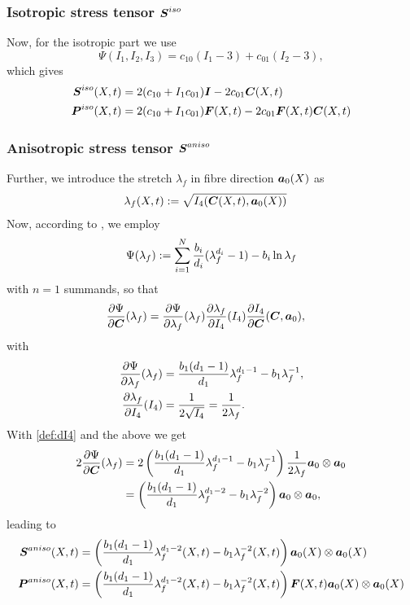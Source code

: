 \subsubsection{Isotropic stress tensor $\boldsymbol{S}^{iso}$}
Now, for the isotropic part we use
\[
	\Psi(I_1,I_2,I_3) = c_{10}(I_1-3) + c_{01}(I_2-3),
\]
which gives
\begin{align}
	\boldsymbol{S}^{iso}(X,t) &= 2(c_{10} + I_1c_{01})\boldsymbol{I} - 2c_{01}\boldsymbol{C}(X,t)\\
	\boldsymbol{P}^{iso}(X,t) &= 2(c_{10} + I_1c_{01})\boldsymbol{F}(X,t) - 2c_{01}\boldsymbol{F}(X,t)\boldsymbol{C}(X,t)
\end{align}

\subsubsection{Anisotropic stress tensor $\boldsymbol{S}^{aniso}$}
Further, we introduce the stretch $\lambda_f$ in fibre direction $\boldsymbol{a}_0(X)$ as
\begin{align*}
	\lambda_f(X,t) &:= \sqrt{I_4(\boldsymbol{C}(X,t),\boldsymbol{a}_0(X))}
\end{align*}
Now, according to \cite{Markert2005}, we employ
\begin{align*}
	\Psi(\lambda_f) := \sum\limits_{i=1}^{N} \frac{b_i}{d_i}(\lambda_f^{d_i} - 1) - b_i\ln\lambda_f
\end{align*}
with $n=1$ summands, so that
\begin{align}
	\frac{\partial \Psi}{\partial \boldsymbol{C}}(\lambda_f) &= \frac{\partial \Psi}{\partial \lambda_f}(\lambda_f)\frac{\partial \lambda_f}{\partial I_4}(I_4)\frac{\partial I_4}{\partial \boldsymbol{C}}(\boldsymbol{C},\boldsymbol{a}_0),\label{eq:dpsidC}
\end{align}
with
\begin{align*}
		 \frac{\partial \Psi}{\partial \lambda_f}(\lambda_f) &= \frac{b_1(d_1-1)}{d_1}\lambda_f^{d_1-1} - b_1\lambda_f^{-1},\\
		 \frac{\partial \lambda_f}{\partial I_4}(I_4) &= \frac{1}{2\sqrt{I_4}} = \frac{1}{2\lambda_f}.
\end{align*}
With \eqref{def:dI4} and the above we get
\begin{align*}
	2\frac{\partial \Psi}{\partial \boldsymbol{C}}(\lambda_f) &= 2\left(\frac{b_1(d_1-1)}{d_1}\lambda_f^{d_1-1} - b_1\lambda_f^{-1}\right) \frac{1}{2\lambda_f}\boldsymbol{a}_0\otimes\boldsymbol{a}_0\\
	&= \left(\frac{b_1(d_1-1)}{d_1}\lambda_f^{d_1-2} - b_1\lambda_f^{-2}\right) \boldsymbol{a}_0\otimes\boldsymbol{a}_0,
\end{align*}
leading to
\begin{align}
	\boldsymbol{S}^{aniso}(X,t) &= \left(\frac{b_1(d_1-1)}{d_1}\lambda_f^{d_1-2}(X,t) - b_1\lambda_f^{-2}(X,t)\right) \boldsymbol{a}_0(X)\otimes\boldsymbol{a}_0(X)\\
	\boldsymbol{P}^{aniso}(X,t) &= \left(\frac{b_1(d_1-1)}{d_1}\lambda_f^{d_1-2}(X,t) - b_1\lambda_f^{-2}(X,t)\right) \boldsymbol{F}(X,t)\boldsymbol{a}_0(X)\otimes\boldsymbol{a}_0(X)
\end{align}

